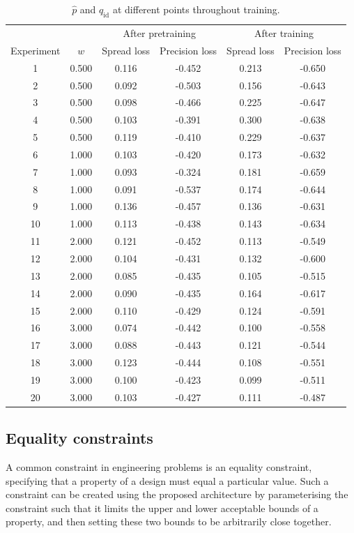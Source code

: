 \documentclass[../../main.tex]{subfiles}
\begin{document}
\begin{table}[H]
    \centering
    \begin{tabular}{*6c}
    \toprule
    {} & {} & \multicolumn{2}{c}{After pretraining} & \multicolumn{2}{c}{After training}\\
    Experiment&$w$&Spread loss&Precision loss&Spread loss&Precision loss\\
    \midrule
    1&0.500&0.116&-0.452&0.213&-0.650\\2&0.500&0.092&-0.503&0.156&-0.643\\3&0.500&0.098&-0.466&0.225&-0.647\\4&0.500&0.103&-0.391&0.300&-0.638\\5&0.500&0.119&-0.410&0.229&-0.637\\6&1.000&0.103&-0.420&0.173&-0.632\\7&1.000&0.093&-0.324&0.181&-0.659\\8&1.000&0.091&-0.537&0.174&-0.644\\9&1.000&0.136&-0.457&0.136&-0.631\\10&1.000&0.113&-0.438&0.143&-0.634\\11&2.000&0.121&-0.452&0.113&-0.549\\12&2.000&0.104&-0.431&0.132&-0.600\\13&2.000&0.085&-0.435&0.105&-0.515\\14&2.000&0.090&-0.435&0.164&-0.617\\15&2.000&0.110&-0.429&0.124&-0.591\\16&3.000&0.074&-0.442&0.100&-0.558\\
    17&3.000&0.088&-0.443&0.121&-0.544\\18&3.000&0.123&-0.444&0.108&-0.551\\19&3.000&0.100&-0.423&0.099&-0.511\\20&3.000&0.103&-0.427&0.111&-0.487\\
    \bottomrule
    \end{tabular}
    \caption[$\hat{p}$ and $q_\text{id}$ during training]{$\hat{p}$ and $q_\text{id}$ at different points throughout training.}
    \label{table:generatorTrainingProgression}
\end{table}

\subsection{Equality constraints} \label{subsection:equalityConstraints}

A common constraint in engineering problems is an equality constraint, specifying that a property of a design must equal a particular value.
Such a constraint can be created using the proposed architecture by parameterising the constraint such that it limits the upper and lower acceptable bounds of a property, and then setting these two bounds to be arbitrarily close together.
\end{document}
